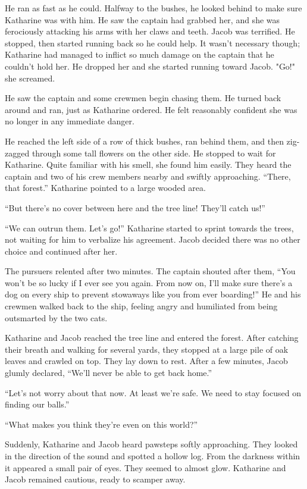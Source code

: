 He ran as fast as he could. Halfway to the bushes, he looked behind to make sure Katharine was with him. He saw the captain had grabbed her, and she was ferociously attacking his arms with her claws and teeth. Jacob was terrified. He stopped, then started running back so he could help. It wasn't necessary though; Katharine had managed to inflict so much damage on the captain that he couldn't hold her. He dropped her and she started running toward Jacob. "Go!" she screamed.

He saw the captain and some crewmen begin chasing them. He turned back around and ran, just as Katharine ordered. He felt reasonably confident she was no longer in any immediate danger.

He reached the left side of a row of thick bushes, ran behind them, and then zig-zagged through some tall flowers on the other side. He stopped to wait for Katharine. Quite familiar with his smell, she found him easily. They heard the captain and two of his crew members nearby and swiftly approaching. “There, that forest.” Katharine pointed to a large wooded area.

“But there's no cover between here and the tree line! They'll catch us!”

“We can outrun them. Let's go!” Katharine started to sprint towards the trees, not waiting for him to verbalize his agreement. Jacob decided there was no other choice and continued after her.

The pursuers relented after two minutes. The captain shouted after them, “You won't be so lucky if I ever see you again. From now on, I'll make sure there's a dog on every ship to prevent stowaways like you from ever boarding!” He and his crewmen walked back to the ship, feeling angry and humiliated from being outsmarted by the two cats.

\timesep

Katharine and Jacob reached the tree line and entered the forest. After catching their breath and walking for several yards, they stopped at a large pile of oak leaves and crawled on top. They lay down to rest. After a few minutes, Jacob glumly declared, “We'll never be able to get back home.”

“Let's not worry about that now. At least we're safe. We need to stay focused on finding our balls.”

“What makes you think they're even on this world?”

Suddenly, Katharine and Jacob heard pawsteps softly approaching. They looked in the direction of the sound and spotted a hollow log. From the darkness within it appeared a small pair of eyes. They seemed to almost glow. Katharine and Jacob remained cautious, ready to scamper away.

